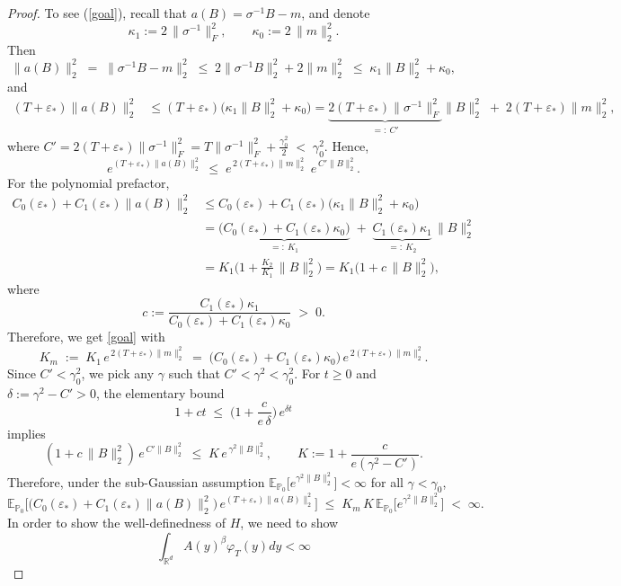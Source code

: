 \documentclass[10pt,a4paper]{amsart}
\newcommand{\E}{\mathbb{E}}
\begin{document}
\begin{proof}
To see (\ref{goal}), recall that \(a(B)=\sigma^{-1}B - m\), and denote
\[
\kappa_1 := 2\,\|\sigma^{-1}\|_F^2,\qquad \kappa_0 := 2\,\|m\|_2^2.
\]
Then
$$\|a(B)\|_2^2 \;=\; \|\sigma^{-1}B - m\|_2^2
\;\le\; 2\|\sigma^{-1}B\|_2^2 + 2\|m\|_2^2
\;\le\; \kappa_1 \|B\|_2^2 + \kappa_0,$$
and
\begin{align*}
(T+\varepsilon_*)\|a(B)\|_2^2
&\le (T+\varepsilon_*)\big(\kappa_1 \|B\|_2^2 + \kappa_0\big)
= \underbrace{2(T+\varepsilon_*)\|\sigma^{-1}\|_F^2}_{=:~C'} \|B\|_2^2 \;+\; 2(T+\varepsilon_*)\|m\|_2^2,
\end{align*}
where
$C'= 2(T+\varepsilon_*)\|\sigma^{-1}\|_F^2
= T\|\sigma^{-1}\|_F^2 + \frac{\gamma_0^2}{2} \;<\; \gamma_0^2.$ 
Hence, 
$$e^{(T+\varepsilon_*)\|a(B)\|_2^2}
\;\le\; e^{\,2(T+\varepsilon_*)\|m\|_2^2}\; e^{\,C'\|B\|_2^2}.$$
For the polynomial prefactor, 
\begin{align*}
C_0(\varepsilon_*) + C_1(\varepsilon_*)\|a(B)\|_2^2
&\le C_0(\varepsilon_*) + C_1(\varepsilon_*)\big(\kappa_1 \|B\|_2^2 + \kappa_0\big) \\
&= \underbrace{\big(C_0(\varepsilon_*) + C_1(\varepsilon_*)\kappa_0\big)}_{=:~K_1}
\;+\; \underbrace{C_1(\varepsilon_*)\kappa_1}_{=:~K_2}\,\|B\|_2^2 \\
&= K_1\Big(1 + \frac{K_2}{K_1}\,\|B\|_2^2\Big)
= K_1\big(1 + c\,\|B\|_2^2\big), 
\end{align*}
where
\[
c := \frac{C_1(\varepsilon_*)\kappa_1}{C_0(\varepsilon_*) + C_1(\varepsilon_*)\kappa_0} \;>\; 0 .
\]
Therefore, we get \eqref{goal} with
\[
K_m \;:=\; K_1\, e^{\,2(T+\varepsilon_*)\|m\|_2^2}
\;=\; \big(C_0(\varepsilon_*) + C_1(\varepsilon_*)\kappa_0\big)\, e^{\,2(T+\varepsilon_*)\|m\|_2^2}.
\]
Since \(C' < \gamma_0^2\), we pick any \(\gamma\) such that \(C' < \gamma^2 < \gamma_0^2\).
For \(t\ge 0\) and \(\delta := \gamma^2 - C' > 0\), the elementary bound
\[
1 + c t \;\le\; \Big(1 + \frac{c}{e\,\delta}\Big)\, e^{\delta t}
\]
implies
\[
(1 + c\,\|B\|_2^2)\, e^{\,C'\|B\|_2^2}
\;\le\; K\, e^{\,\gamma^2 \|B\|_2^2},
\qquad K := 1 + \frac{c}{e(\gamma^2 - C')}.
\]
Therefore, under the sub-Gaussian assumption
\(\E_{\mathbb{P}_0}\big[e^{\gamma^2\|B\|_2^2}\big] < \infty\) for all \(\gamma < \gamma_0\),
\[
\E_{\mathbb{P}_0}\!\Big[\bigl(C_0(\varepsilon_*) + C_1(\varepsilon_*)\|a(B)\|_2^2\bigr)\, e^{(T+\varepsilon_*)\|a(B)\|_2^2}\Big]
\;\le\; K_m\,K\,\E_{\mathbb{P}_0}\big[e^{\gamma^2\|B\|_2^2}\big] \;<\; \infty.
\]
In order to show the well-definedness of $H$, we need to show
\begin{equation}\label{CS}
    \int_{\mathbb{R}^d}A(y)^{\beta}\varphi_T(y)dy < \infty

\end{equation}
\end{proof}
\end{document}
